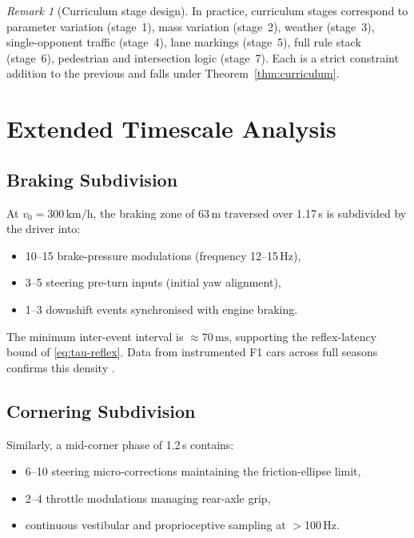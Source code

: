 \documentclass[11pt,twocolumn]{article}
\theoremstyle{definition}
\theoremstyle{remark}
\newtheorem{remark}[theorem]{Remark}
\begin{document}
\begin{remark}[Curriculum stage design]\label{rem:stage}
In practice, curriculum stages correspond to parameter variation (stage~1), mass variation (stage~2), weather (stage~3), single-opponent traffic (stage~4), lane markings (stage~5), full rule stack (stage~6), pedestrian and intersection logic (stage~7). Each is a strict constraint addition to the previous and falls under Theorem~\ref{thm:curriculum}.
\end{remark}

\section{Extended Timescale Analysis}
\label{app:timescales}

\subsection{Braking Subdivision}

At $v_0 = 300\,\mathrm{km/h}$, the braking zone of 63\,m traversed over 1.17\,s is subdivided by the driver into:
\begin{itemize}[leftmargin=*,itemsep=2pt]
\item 10--15 brake-pressure modulations (frequency 12--15\,Hz),
\item 3--5 steering pre-turn inputs (initial yaw alignment),
\item 1--3 downshift events synchronised with engine braking.
\end{itemize}

The minimum inter-event interval is $\approx 70\,\mathrm{ms}$, supporting the reflex-latency bound of \eqref{eq:tau-reflex}. Data from instrumented F1 cars across full seasons confirms this density \cite{fia2023technical,fastf12023docs,ergast2023docs}.

\subsection{Cornering Subdivision}

Similarly, a mid-corner phase of 1.2\,s contains:
\begin{itemize}[leftmargin=*,itemsep=2pt]
\item 6--10 steering micro-corrections maintaining the friction-ellipse limit,
\item 2--4 throttle modulations managing rear-axle grip,
\item continuous vestibular and proprioceptive sampling at $>$100\,Hz.
\end{itemize}
\end{document}
